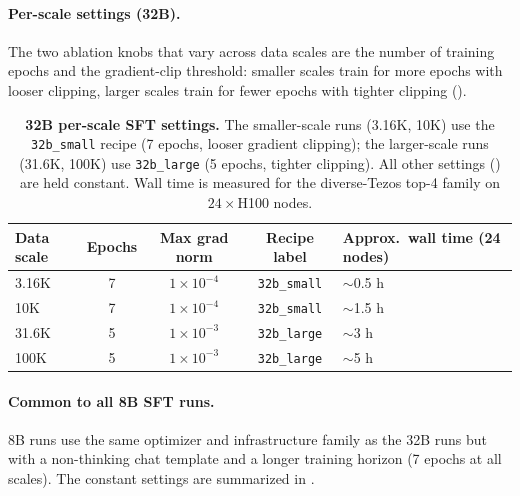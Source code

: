 \paragraph{Per-scale settings (32B).}
The two ablation knobs that vary across data scales are the number of training
epochs and the gradient-clip threshold: smaller scales train for more epochs
with looser clipping, larger scales train for fewer epochs with tighter
clipping ().

\begin{table}[!htbp]
\centering
\begin{tabular}{lcccl}
\toprule
Data scale & Epochs & Max grad norm & Recipe label & Approx.\ wall time (24 nodes) \\
\midrule
3.16K & 7 & $1\times10^{-4}$ & \texttt{32b\_small}  & $\sim$0.5 h \\
10K   & 7 & $1\times10^{-4}$ & \texttt{32b\_small}  & $\sim$1.5 h \\
31.6K & 5 & $1\times10^{-3}$ & \texttt{32b\_large}  & $\sim$3 h \\
100K  & 5 & $1\times10^{-3}$ & \texttt{32b\_large}  & $\sim$5 h \\
\bottomrule
\end{tabular}
\vspace{6pt}
\caption{\textbf{32B per-scale SFT settings.} The smaller-scale runs (3.16K, 10K) use the
\texttt{32b\_small} recipe (7 epochs, looser gradient clipping); the larger-scale
runs (31.6K, 100K) use \texttt{32b\_large} (5 epochs, tighter clipping). All
other settings () are held constant. Wall time is
measured for the diverse-Tezos top-4 family on $24\times$H100 nodes.}
\label{tab:sft_hp_per_scale_32b}
\end{table}


\paragraph{Common to all 8B SFT runs.}
8B runs use the same optimizer and infrastructure family as the 32B runs but
with a non-thinking chat template and a longer training horizon (7 epochs at
all scales). The constant settings are summarized in
.

